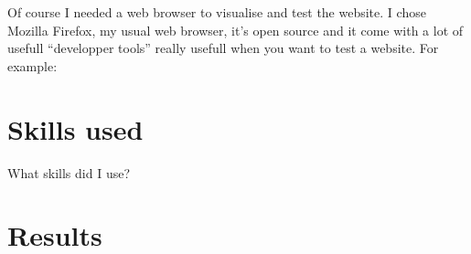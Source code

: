 \documentclass[10pt,a4paper]{article}
\begin{document}
Of course I needed a web browser to visualise and test the website. I chose Mozilla Firefox, my usual web browser, it's open source and it come with a lot of usefull ``developper tools'' really usefull when you want to test a website. For example:
\begin{itemize}

\end{itemize}

\section{Skills used}
What skills did I use?
\section{Results}
\end{document}
